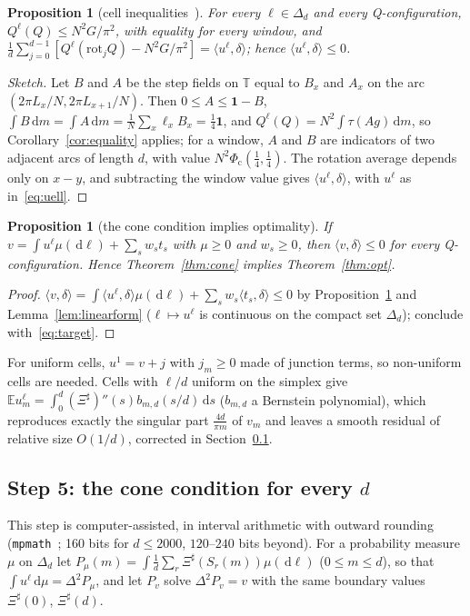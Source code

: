 \documentclass[11pt]{article}
\newtheorem{proposition}[lemma]{Proposition}
\theoremstyle{remark}
\numberwithin{equation}{section}
\newcommand{\T}{\mathbb{T}}
\newcommand{\E}{\mathbb{E}}
\newcommand{\one}{\mathbf{1}}
\newcommand{\ip}[2]{\langle #1,#2\rangle}
\newcommand{\Sh}{\Xi^{\sharp}}
\newcommand{\Phic}{\Phi_{\mathrm c}}
\newcommand{\dd}{\,\mathrm{d}}
\begin{document}
\begin{proposition}[cell inequalities~{\cite[Propositions~5.2, 5.3]{MSmath}}]\label{prop:average}
For every $\ell\in\Delta_d$ and every Q-configuration, $Q^\ell(Q)\le N^2G/\pi^2$, with equality for every window, and
$\frac1d\sum_{j=0}^{d-1}[Q^\ell(\mathrm{rot}_jQ)-N^2G/\pi^2]=\ip{u^\ell}\delta$; hence $\ip{u^\ell}\delta\le0$.
\end{proposition}

\begin{proof}[Sketch]
Let $B$ and $A$ be the step fields on $\T$ equal to $B_x$ and $A_x$ on the arc $(2\pi L_x/N,2\pi L_{x+1}/N)$. Then
$0\le A\le\one-B$, $\int B\dd m=\int A\dd m=\frac1N\sum_x\ell_xB_x=\frac14\one$, and $Q^\ell(Q)=N^2\int\tau(Ag)\dd m$, so
Corollary~\ref{cor:equality} applies; for a window, $A$ and $B$ are indicators of two adjacent arcs of length $d$, with
value $N^2\Phic(\frac14,\frac14)$. The rotation average depends only on $x-y$, and subtracting the window value gives
$\ip{u^\ell}\delta$, with $u^\ell$ as in~\eqref{eq:uell}.
\end{proof}

\begin{proposition}[the cone condition implies optimality]\label{prop:conetoopt}
If $v=\int u^\ell\mu(\dd\ell)+\sum_sw_st_s$ with $\mu\ge0$ and $w_s\ge0$, then $\ip v\delta\le0$ for every
Q-configuration. Hence Theorem~\ref{thm:cone} implies Theorem~\ref{thm:opt}.
\end{proposition}

\begin{proof}
$\ip v\delta=\int\ip{u^\ell}\delta\mu(\dd\ell)+\sum_sw_s\ip{t_s}\delta\le0$ by Proposition~\ref{prop:average} and
Lemma~\ref{lem:linearform} ($\ell\mapsto u^\ell$ is continuous on the compact set $\Delta_d$); conclude
with~\eqref{eq:target}.
\end{proof}

For uniform cells, $u^1=v+j$ with $j_m\ge0$ made of junction terms, so non-uniform cells are needed. Cells with
$\ell/d$ uniform on the simplex give $\E u^\ell_m=\int_0^d(\Sh)''(s)b_{m,d}(s/d)\dd s$ ($b_{m,d}$ a Bernstein polynomial),
which reproduces exactly the singular part $\frac{4d}{\pi m}$ of $v_m$ and leaves a smooth residual of relative size
$O(1/d)$, corrected in Section~\ref{subsec:cone}.

\subsection{Step 5: the cone condition for every \texorpdfstring{$d$}{d}}\label{subsec:cone}
This step is computer-assisted, in interval arithmetic with outward rounding (\texttt{mpmath}~\cite{mpmath}; 160 bits
for $d\le2000$, $120$--$240$ bits beyond). For a probability measure $\mu$ on $\Delta_d$ let
$P_\mu(m)=\int\frac1d\sum_r\Sh(S_r(m))\mu(\dd\ell)$ ($0\le m\le d$), so that $\int u^\ell\dd\mu=\Delta^2P_\mu$, and let $P_v$
solve $\Delta^2P_v=v$ with the same boundary values $\Sh(0)$, $\Sh(d)$.
\end{document}
